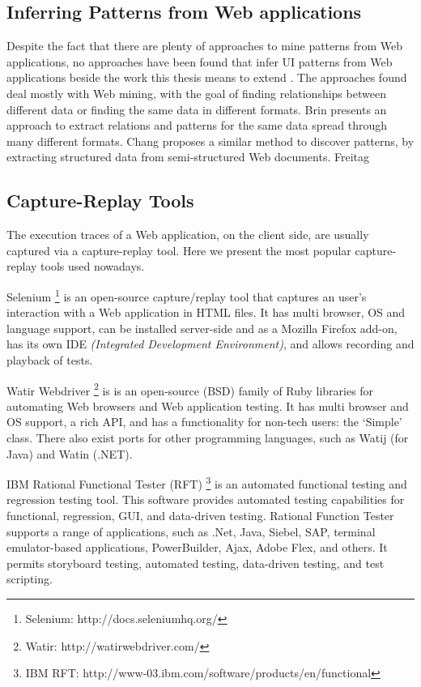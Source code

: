 \subsection{Inferring Patterns from Web applications}
Despite the fact that there are plenty of approaches to mine patterns from Web applications, no approaches have been found that infer UI patterns from Web applications beside the work this thesis means to extend \cite{nabuco2013inferring,morgado2012gui}. The approaches found deal mostly with Web mining, with the goal of finding relationships between different data or finding the same data in different formats. Brin \cite{brin1999extracting} presents an approach to extract relations and patterns for the same data spread through many different formats. Chang \cite{chang2003automatic} proposes a similar method to discover patterns, by extracting structured data from semi-structured Web documents. Freitag \cite{freitag1998information} 



\subsection{Capture-Replay Tools}
The execution traces of a Web application, on the client side, are usually captured via a capture-replay tool. Here we present the most popular capture-replay tools used nowadays.

Selenium \footnote{Selenium: http://docs.seleniumhq.org/} is an open-source capture/replay tool that captures an user's interaction with a Web application in HTML files. It has multi browser, OS and language support, can be installed server-side and as a Mozilla Firefox add-on, has its own IDE \textit{(Integrated Development Environment)}, and allows recording and playback of tests.

Watir Webdriver \footnote{Watir: http://watirwebdriver.com/} is is an open-source (BSD) family of Ruby libraries for automating Web browsers and Web application testing. It has multi browser and OS support, a rich API, and has a functionality for non-tech users: the ‘Simple’ class. There also exist ports for other programming languages, such as Watij (for Java) and Watin (.NET).

IBM Rational Functional Tester (RFT) \footnote{IBM RFT: http://www-03.ibm.com/software/products/en/functional} is an automated functional testing and regression testing tool. This software provides automated testing capabilities for functional, regression, GUI, and data-driven testing. Rational Function Tester supports a range of applications, such as .Net, Java, Siebel, SAP, terminal emulator-based applications, PowerBuilder, Ajax, Adobe Flex, and others. It permits storyboard testing, automated testing, data-driven testing, and test scripting.

